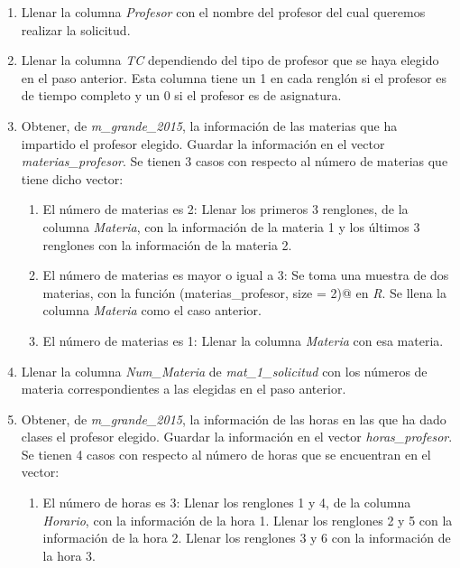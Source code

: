   \begin{enumerate}

\item Llenar la columna \textit{Profesor} con el nombre del profesor del cual queremos realizar la solicitud.

\item Llenar la columna \textit{TC} dependiendo del tipo de profesor que se haya elegido en el paso anterior. Esta columna tiene un 1 en cada renglón si el profesor es de tiempo completo y un 0 si el profesor es de asignatura.

\item Obtener, de \textit{m\_grande\_2015}, la información de las materias que ha impartido el profesor elegido. Guardar la información en el vector \textit{materias\_profesor}. Se tienen 3 casos con respecto al número de materias que tiene dicho vector:

\begin{enumerate}
\item El número de materias es 2: Llenar los primeros 3 renglones, de la columna \textit{Materia}, con la información de la materia 1 y los últimos 3 renglones con la información de la materia 2.

\item El número de materias es mayor o igual a 3: Se toma una muestra de dos materias, con la función \verb@sample(materias_profesor, size = 2)@ en \textit{R}. Se llena la columna \textit{Materia} como el caso anterior.

\item El número de materias es 1: Llenar la columna \textit{Materia} con esa materia.
\end{enumerate}

\item Llenar la columna \textit{Num\_Materia} de \textit{mat\_1\_solicitud} con los números de materia correspondientes a las elegidas en el paso anterior.

\item Obtener, de \textit{m\_grande\_2015}, la información de las horas en las que ha dado clases el profesor elegido. Guardar la información en el vector \textit{horas\_profesor}. Se tienen 4 casos con respecto al número de horas que se encuentran en el vector:

\begin{enumerate}
\item El número de horas es 3: Llenar los renglones 1 y 4, de la columna \textit{Horario}, con la información de la hora 1. Llenar los renglones 2 y 5 con la información de la hora 2. Llenar los renglones 3 y 6 con la información de la hora 3.


\end{enumerate}
\end{enumerate}
